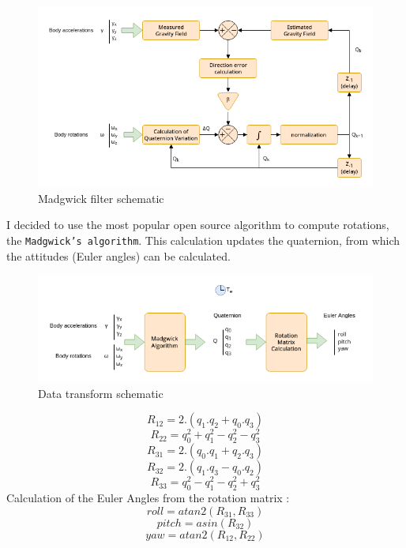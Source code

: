 \begin{figure}[H]
    \centering
    \includegraphics[width=0.9\linewidth]{./projects/pmodnav/madgwick.png}
    \caption{Madgwick filter schematic}
\end{figure}
I decided to use the most popular open source algorithm to compute rotations, the \texttt{Madgwick's algorithm}\cite{Madgwick}. This calculation updates the quaternion, from which the attitudes (Euler angles) can be calculated.
\begin{figure}[H]
    \centering
    \includegraphics[width=0.9\linewidth]{./projects/pmodnav/madgwick_applied.png}
    \caption{Data transform schematic}
\end{figure}
$$ R_{12} = 2.(q_1.q_2+q_0.q_3) $$
$$ R_{22} = q_0^2+q_1^2-q_2^2-q_3^2 $$
$$ R_{31} = 2.(q_0.q_1+q_2.q_3) $$
$$ R_{32} = 2.(q_1.q_3-q_0.q_2) $$
$$ R_{33} = q_0^2-q_1^2-q_2^2+q_3^2 $$
Calculation of the Euler Angles from the rotation matrix :
$$ roll = atan2(R_{31},R_{33}) $$
$$ pitch = asin(R_{32}) $$
$$ yaw = atan2(R_{12},R_{22}) $$


